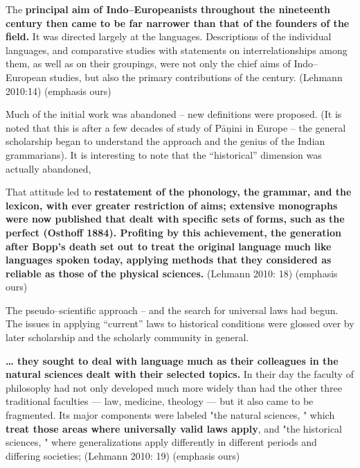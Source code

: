 \begin{myquote}
The \textbf{principal aim of Indo–Europeanists throughout the nineteenth century then came to be far narrower than that of the founders of the field.} It was directed largely at the languages. Descriptions of the individual languages, and comparative studies with statements on interrelationships among them, as well as on their groupings, were not only the chief aims of Indo–European studies, but also the primary contributions of the century. (Lehmann 2010:14) (emphasis ours)
\end{myquote}

Much of the initial work was abandoned – new definitions were proposed. (It is noted that this is after a few decades of study of Pāņini in Europe – the general scholarship began to understand the approach and the genius of the Indian grammarians). It is interesting to note that the “historical” dimension was actually abandoned,

\begin{myquote}
That attitude led to \textbf{restatement of the phonology, the grammar, and the lexicon, with ever greater restriction of aims; extensive monographs were now published that dealt with specific sets of forms, such as the perfect (Osthoff 1884). Profiting by this achievement, the generation after Bopp's death set out to treat the original language much like languages spoken today, applying methods that they considered as reliable as those of the physical sciences.} (Lehmann 2010: 18) (emphasis ours)
\end{myquote}

The pseudo–scientific approach – and the search for universal laws had begun. The issues in applying “current” laws to historical conditions were glossed over by later scholarship and the scholarly community in general.

\begin{myquote}
\textbf{… they sought to deal with language much as their colleagues in the natural sciences dealt with their selected topics.} In their day the faculty of philosophy had not only developed much more widely than had the other three traditional faculties — law, medicine, theology — but it also came to be fragmented. Its major components were labeled "the natural sciences, " which \textbf{treat those areas where universally valid laws apply}, and "the historical sciences, " where generalizations apply differently in different periods and differing societies; (Lehmann 2010: 19) (emphasis ours)
\end{myquote}

